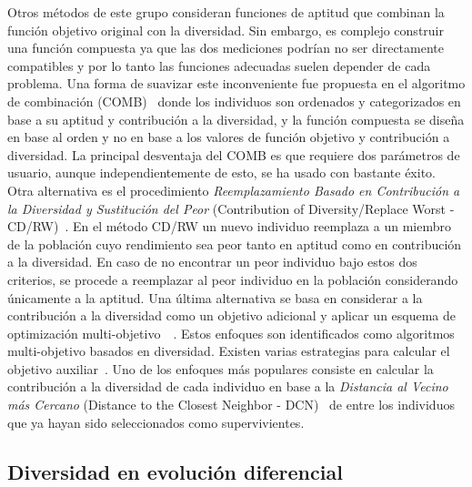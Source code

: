 Otros métodos de este grupo consideran funciones de aptitud que combinan la función objetivo original con la diversidad.
%
Sin embargo, es complejo construir una función compuesta ya que las dos mediciones podrían no ser directamente compatibles
y por lo tanto las funciones adecuadas suelen depender de cada problema.
%
Una forma de suavizar este inconveniente fue propuesta en el algoritmo de combinación (COMB)~\cite{vidal2013hybrid} donde los individuos son ordenados 
y categorizados en base a su aptitud y contribución a la diversidad, y la función compuesta se diseña en base al orden y no en base a los valores de función objetivo
y contribución a diversidad.
%
La principal desventaja del COMB es que requiere dos parámetros de usuario, aunque independientemente de esto, se ha usado con bastante éxito.
%
Otra alternativa es el procedimiento \textit{Reemplazamiento Basado en Contribución a la Diversidad y Sustitución del Peor} 
(Contribution of Diversity/Replace Worst - CD/RW)~\cite{lozano2008replacement}.
%
En el método CD/RW un nuevo individuo reemplaza a un miembro de la población cuyo rendimiento sea peor tanto en aptitud como en contribución a la diversidad.
%
En caso de no encontrar un peor individuo bajo estos dos criterios, se procede a reemplazar al peor individuo en la población considerando únicamente a la aptitud.
%
Una última alternativa se basa en considerar a la contribución a la diversidad como un objetivo adicional y aplicar un esquema de 
optimización multi-objetivo~\cite{bui2005multiobjective}~\cite{mouret2011novelty}.
%
Estos enfoques son identificados como algoritmos multi-objetivo basados en diversidad.
%
Existen varias estrategias para calcular el objetivo auxiliar~\cite{segura2013using}.
%
Uno de los enfoques más populares consiste en calcular la contribución a la diversidad de cada individuo en base a 
la \textit{Distancia al Vecino más Cercano} (Distance to the Closest Neighbor - DCN)~\cite{segura2016novel} de entre los individuos que ya hayan sido seleccionados
como supervivientes.


\subsection{Diversidad en evolución diferencial}

